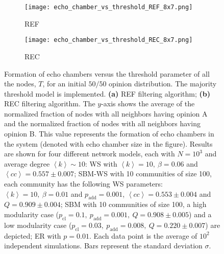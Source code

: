 \documentclass[11 pt , letterpaper , twoside , openright]{book}
\begin{document}
\begin{figure}[H]
  \begin{subfigure}[b]{0.49\textwidth}
    \caption{REF}
  	\texttt{[image: echo\_chamber\_vs\_threshold\_REF\_8x7.png]}
    \label{REF_thres}
  \end{subfigure}
  \begin{subfigure}[b]{0.49\textwidth}
    \caption{REC}
  	\texttt{[image: echo\_chamber\_vs\_threshold\_REC\_8x7.png]}
    \label{REC_thres}
  \end{subfigure}
  \captionsetup{format=plain}
  \caption[Formation of echo chambers versus the threshold parameter of all the nodes, $T$, for the REF and REC filtering algorithms and an initial $50/50$ opinion distribution. The majority threshold model is implemented.]{Formation of echo chambers versus the threshold parameter of all the nodes, $T$, for an initial $50/50$ opinion distribution. The majority threshold model is implemented. \textbf{(a)} REF filtering algorithm; \textbf{(b)} REC filtering algorithm. The $y$-axis shows the average of the normalized fraction of nodes with all neighbors having opinion A and the normalized fraction of nodes with all neighbors having opinion B. This value represents the formation of echo chambers in the system (denoted with echo chamber size in the figure). Results are shown for four different network models, each with $N=10^3$ and average degree $\left<k\right> \sim 10$: WS with $\left<k\right> =10,\ \beta = 0.06$ and $\left<cc\right> = 0.557 \pm 0.007$; SBM-WS with 10 communities of size 100, each community has the following WS parameters: $\left<k\right> = 10,\ \beta = 0.01$ and $p_{\text{add}} = 0.001$, $\left<cc\right> = 0.553 \pm 0.004$ and $Q = 0.909 \pm 0.004$; SBM with 10 communities of size 100, a high modularity case ($p_{\text{cl}} = 0.1,\ p_{\text{add}} = 0.001,\ Q = 0.908 \pm 0.005$) and a low modularity case ($p_{\text{cl}} = 0.03,\ p_{\text{add}} = 0.008,\ Q = 0.220 \pm 0.007$) are depicted; ER with $p= 0.01$. Each data point is the average of $10^2$ independent simulations. Bars represent the standard deviation $\sigma$.}
\label{echo_vs_threshold_REF-REC}
\end{figure}
\noindent
\end{document}

